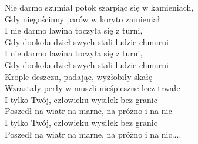 
\begin{flushleft}
Nie darmo szumiał potok szarpiąc się w kamieniach, \\
Gdy niegościnny parów w koryto zamieniał \\
\vskip 3mm
\hspace{0.9cm}I nie darmo lawina toczyła się z turni, \\
\hspace{0.9cm}Gdy dookoła dzieł swych stali ludzie chmurni \\
\vskip 3mm
\hspace{0.9cm}I nie darmo lawina toczyła się z turni, \\
\hspace{0.9cm}Gdy dookoła dzieł swych stali ludzie chmurni \\
\vskip 3mm
Krople deszczu, padając, wyżłobiły skałę \\
Wzrastały perły w muszli-nieśpieszne lecz trwałe \\
\vskip 3mm
\hspace{0.9cm}I tylko Twój, człowieku wysiłek bez granic \\
\hspace{0.9cm}Poszedł na wiatr na marne, na próżno i na nic \\
\vskip 3mm
\hspace{0.9cm}I tylko Twój, człowieku wysiłek bez granic \\
\hspace{0.9cm}Poszedł na wiatr na marne, na próżno i na nic.... \\
\end{flushleft}
\clearpage
